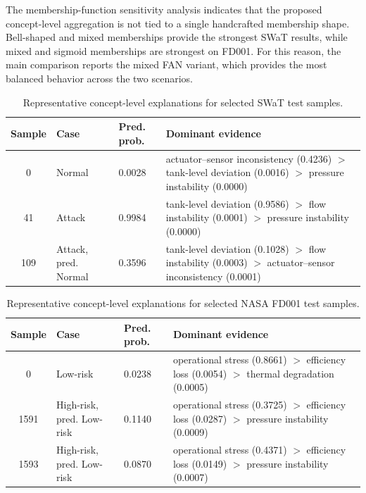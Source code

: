 \documentclass[runningheads]{llncs}
\begin{document}
The membership-function sensitivity analysis indicates that the proposed concept-level aggregation is not tied to a single handcrafted membership shape. Bell-shaped and mixed memberships provide the strongest SWaT results, while mixed and sigmoid memberships are strongest on FD001. For this reason, the main comparison reports the mixed FAN variant, which provides the most balanced behavior across the two scenarios.

\begin{table}[tbp]
\caption{Representative concept-level explanations for selected SWaT test samples.}
\label{tab:qualitative_swat}
\centering
\scriptsize
\begin{tabularx}{\textwidth}{cllX}
\toprule
Sample & Case & Pred. prob. & Dominant evidence \\
\midrule
0   & Normal & 0.0028 &
actuator--sensor inconsistency (0.4236) $>$ tank-level deviation (0.0016) $>$ pressure instability (0.0000) \\
41  & Attack & 0.9984 &
tank-level deviation (0.9586) $>$ flow instability (0.0001) $>$ pressure instability (0.0000) \\
109 & Attack, pred. Normal & 0.3596 &
tank-level deviation (0.1028) $>$ flow instability (0.0003) $>$ actuator--sensor inconsistency (0.0001) \\
\bottomrule
\end{tabularx}
\end{table}

\begin{table}[tbp]
\caption{Representative concept-level explanations for selected NASA FD001 test samples.}
\label{tab:qualitative_fd001}
\centering
\scriptsize
\begin{tabularx}{\textwidth}{cllX}
\toprule
Sample & Case & Pred. prob. & Dominant evidence \\
\midrule
0    & Low-risk & 0.0238 &
operational stress (0.8661) $>$ efficiency loss (0.0054) $>$ thermal degradation (0.0005) \\
1591 & High-risk, pred. Low-risk & 0.1140 &
operational stress (0.3725) $>$ efficiency loss (0.0287) $>$ pressure instability (0.0009) \\
1593 & High-risk, pred. Low-risk & 0.0870 &
operational stress (0.4371) $>$ efficiency loss (0.0149) $>$ pressure instability (0.0007) \\
\bottomrule
\end{tabularx}
\end{table}
\end{document}
